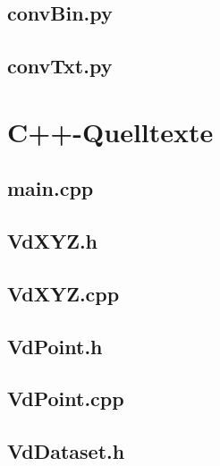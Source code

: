 \documentclass[a4paper,12pt,bibliography=totoc, listof=totoc,titlepage,pointlessnumbers]{scrreprt}
\begin{document}
\begin{appendices}
\section{convBin.py}
\label{a:convBin.py}


\section{convTxt.py}
\label{a:convTxt.py}


\chapter{C++-Quelltexte}
\label{a:cpp}

\section{main.cpp}
\label{a:main.cpp}


\section{VdXYZ.h}
\label{a:VdXYZ.h}


\section{VdXYZ.cpp}
\label{a:VdXYZ.cpp}


\section{VdPoint.h}
\label{a:VdPoint.h}


\section{VdPoint.cpp}
\label{a:VdPoint.cpp}


\section{VdDataset.h}
\label{a:VdDataset.h}



\end{appendices}
\end{document}

